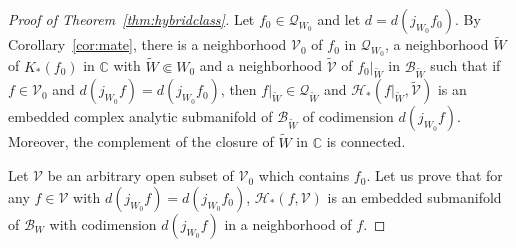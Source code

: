 \documentclass{amsart}
\numberwithin{equation}{section}
\newtheorem{lemma}[theorem]{Lemma}%
\newcommand{\C}{\mathbb C}
\theoremstyle{definition}
\theoremstyle{remark}
\begin{document}
 


\begin{proof} [Proof of Theorem~\ref{thm:hybridclass}]
Let $f_0\in \mathcal{Q}_{W_0}$ and let $d=d(j_{W_0}f_0)$. By Corollary~\ref{cor:mate}, there is a neighborhood $\mathcal{V}_0$ of $f_0$ in $\mathcal{Q}_{W_0}$, a neighborhood $\widetilde{W}$ of $K_*(f_0)$ in $\C$ with $\widetilde{W}\Subset W_0$ and a neighborhood $\widetilde{\mathcal{V}}$ of $f_0|_{\widetilde{W}}$ in $\mathcal{B}_{\widetilde{W}}$ such that if $f\in \mathcal{V}_{0}$ and $d(j_{W_0}f)=d(j_{W_0}f_0)$, then $f|_{\widetilde{W}}\in \mathcal{Q}_{\widetilde{W}}$ and $\mathcal{H}_*(f|_{\widetilde{W}}, \widetilde{\mathcal{V}})$ is an embedded complex analytic submanifold of $\mathcal{B}_{\widetilde{W}}$ of codimension $d(j_{W_0}f)$. Moreover, the complement of the closure of $\widetilde{W}$ in $\C$ is connected.


Let $\mathcal{V}$ be an arbitrary open subset of $\mathcal{V}_0$ which contains $f_0$.
Let us prove that for any $f\in \mathcal{V}$ with $d(j_{W_0}f)=d(j_{W_0}f_0)$,  $\mathcal{H}_*(f, \mathcal{V})$ is an embedded submanifold of $\mathcal{B}_W$ with codimension $d(j_{W_0}f)$ in a neighborhood of $f$.



\end{proof}
\end{document}

